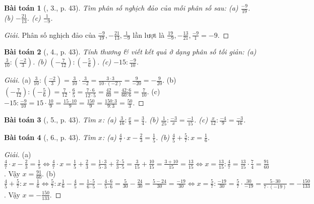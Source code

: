 \documentclass{article}
\newtheorem{baitoan}{Bài toán}
\begin{document}
\begin{baitoan}[\cite{SGK_Toan_6_Canh_Dieu_tap_2}, 3., p. 43]
	Tìm phân số nghịch đảo của mỗi phân số sau: (a) $\frac{-9}{19}$. (b) $-\frac{21}{13}$. (c) $\frac{1}{-9}$.
\end{baitoan}

\begin{proof}[Giải]
	Phân số nghịch đảo của $\frac{-9}{19},-\frac{21}{13},\frac{1}{-9}$ lần lượt là $\frac{19}{-9},-\frac{13}{21},\frac{-9}{1} = -9$. 
\end{proof}

\begin{baitoan}[\cite{SGK_Toan_6_Canh_Dieu_tap_2}, 4., p. 43]
	Tính thương \& viết kết quả ở dạng phân số tối giản: (a) $\frac{3}{10}:\left(\frac{-2}{3}\right)$. (b) $\left(-\frac{7}{12}\right):\left(-\frac{5}{6}\right)$. (c) $-15:\frac{-9}{10}$.
\end{baitoan}

\begin{proof}[Giải]
	(a) $\frac{3}{10}:\left(\frac{-2}{3}\right) = \frac{3}{10}\cdot\frac{3}{-2} = \frac{3\cdot3}{10\cdot(-2)} = \frac{9}{-20} = -\frac{9}{20}$. (b) $\left(-\frac{7}{12}\right):\left(-\frac{5}{6}\right) = \frac{7}{12}\cdot\frac{6}{5} = \frac{7\cdot6}{12\cdot5} = \frac{42}{60} = \frac{42:6}{60:6} = \frac{7}{10}$. (c) $-15:\frac{-9}{10} = 15\cdot\frac{10}{9} = \frac{15\cdot10}{9} = \frac{150}{9} = \frac{150:3}{9:3} = \frac{50}{3}$.
\end{proof}

\begin{baitoan}[\cite{SGK_Toan_6_Canh_Dieu_tap_2}, 5., p. 43]
	Tìm $x$: (a) $\frac{3}{16}:\frac{x}{8} = \frac{3}{4}$. (b) $\frac{1}{25}:\frac{-3}{x} = \frac{-1}{15}$. (c) $\frac{x}{12}:\frac{-4}{9} = \frac{-3}{16}$.
\end{baitoan}

\begin{baitoan}[\cite{SGK_Toan_6_Canh_Dieu_tap_2}, 6., p. 43]
	Tìm $x$: (a) $\frac{4}{7}\cdot x - \frac{2}{3} = \frac{1}{5}$. (b) $\frac{4}{5} + \frac{5}{7}:x = \frac{1}{6}$.
\end{baitoan}

\begin{proof}[Giải]
	(a) $\frac{4}{7}\cdot x - \frac{2}{3} = \frac{1}{5}\Leftrightarrow\frac{4}{7}\cdot x = \frac{1}{5} + \frac{2}{3} = \frac{1\cdot3}{5\cdot3} + \frac{2\cdot5}{3\cdot5} = \frac{3}{15} + \frac{10}{15} = \frac{3 + 10}{15} = \frac{13}{15}\Leftrightarrow x = \frac{13}{15}:\frac{4}{7} = \frac{13}{15}\cdot\frac{7}{4} = \frac{91}{60}$. Vậy $x = \frac{91}{60}$. (b) $\frac{4}{5} + \frac{5}{7}:x = \frac{1}{6}\Leftrightarrow\frac{5}{7}:x  \frac{1}{6} - \frac{4}{5} = \frac{1\cdot5}{6\cdot5} - \frac{4\cdot6}{5\cdot6} = \frac{5}{30} - \frac{24}{30} = \frac{5 - 24}{30} = \frac{-19}{30}\Leftrightarrow x = \frac{5}{7}:\frac{-19}{30} = \frac{5}{7}\cdot\frac{30}{-19} = \frac{5\cdot30}{7\cdot(-19)} = -\frac{150}{133}$. Vậy $x = -\frac{150}{133}$.
\end{proof}
\end{document}

